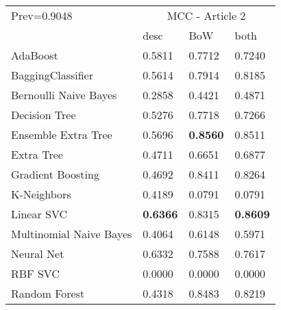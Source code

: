 \begin{tabular}{|l|l|l|l| }
\hline
Prev=0.9048 &  \multicolumn{3}{c|}{MCC - Article 2} \\
\cline{2-4} & desc & BoW & both \\ \hline
AdaBoost                & 0.5811 & 0.7712 & 0.7240\\
BaggingClassifier       & 0.5614 & 0.7914 & 0.8185\\
Bernoulli Naive Bayes   & 0.2858 & 0.4421 & 0.4871\\
Decision Tree           & 0.5276 & 0.7718 & 0.7266\\
Ensemble Extra Tree     & 0.5696 & {\bf 0.8560} & 0.8511\\
Extra Tree              & 0.4711 & 0.6651 & 0.6877\\
Gradient Boosting       & 0.4692 & 0.8411 & 0.8264\\
K-Neighbors             & 0.4189 & 0.0791 & 0.0791\\
Linear SVC              & {\bf 0.6366} & 0.8315 & {\bf 0.8609}\\
Multinomial Naive Bayes & 0.4064 & 0.6148 & 0.5971\\
Neural Net              & 0.6332 & 0.7588 & 0.7617\\
RBF SVC                 & 0.0000 & 0.0000 & 0.0000\\
Random Forest           & 0.4318 & 0.8483 & 0.8219\\
\hline
\end{tabular}